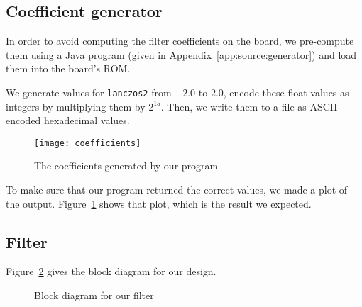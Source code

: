 
\subsection{Coefficient generator}
In order to avoid computing the filter coefficients on the board, we pre-compute them using a Java program (given in Appendix~\ref{app:source:generator}) and load them into the board's ROM.

We generate values for \texttt{lanczos2} from $-2.0$ to $2.0$, encode these float values as integers by multiplying them by $2^15$.
Then, we write them to a file as ASCII-encoded hexadecimal values.

\begin{figure}
	\centering
	\texttt{[image: coefficients]}
	\caption{The coefficients generated by our program}
	\label{fig:coefficients}
\end{figure}

To make sure that our program returned the correct values, we made a plot of the output.
Figure~\ref{fig:coefficients} shows that plot, which is the result we expected.

\subsection{Filter}

Figure~\ref{fig:design:block} gives the block diagram for our design.

\begin{figure}[h]
	\centering
	\def\svgwidth{0.6\textwidth}
	
	\caption{Block diagram for our filter}
	\label{fig:design:block}
\end{figure}
